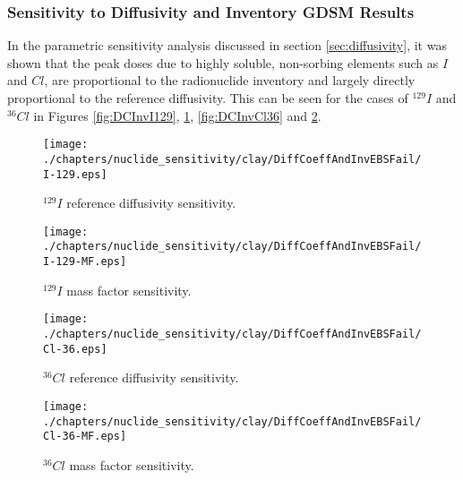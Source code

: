 
\subsubsection{Sensitivity to Diffusivity and Inventory GDSM Results}

In the parametric sensitivity analysis discussed in section
\ref{sec:diffusivity}, it was shown that
the peak doses due to highly soluble, non-sorbing elements such as $I$ and $Cl$, 
are  proportional to the radionuclide inventory and 
largely directly proportional to the reference diffusivity. This can be seen for 
the cases of $^{129}I$ and $^{36}Cl$ in Figures \ref{fig:DCInvI129}, 
\ref{fig:DCInvI129MF}, \ref{fig:DCInvCl36} and \ref{fig:DCInvCl36MF}.

\begin{figure}[ht]
\centering
\begin{minipage}[b]{0.45\linewidth}

\texttt{[image: ./chapters/nuclide\_sensitivity/clay/DiffCoeffAndInvEBSFail/I-129.eps]}
\caption{$^{129}I$ reference diffusivity sensitivity.}
\label{fig:DCInvI129}

\end{minipage}
\hspace{0.05\linewidth}
\begin{minipage}[b]{0.45\linewidth}

\texttt{[image: ./chapters/nuclide\_sensitivity/clay/DiffCoeffAndInvEBSFail/I-129-MF.eps]}
\caption{$^{129}I$ mass factor sensitivity.}
\label{fig:DCInvI129MF}

\end{minipage}
\end{figure}

\begin{figure}[ht]
\begin{minipage}[b]{0.45\linewidth}

\texttt{[image: ./chapters/nuclide\_sensitivity/clay/DiffCoeffAndInvEBSFail/Cl-36.eps]}
\caption{$^{36}Cl$ reference diffusivity sensitivity.}
\label{fig:DCInvCl36}

\end{minipage}
\hspace{0.05\linewidth}
\begin{minipage}[b]{0.45\linewidth}

\texttt{[image: ./chapters/nuclide\_sensitivity/clay/DiffCoeffAndInvEBSFail/Cl-36-MF.eps]}
\caption{$^{36}Cl$ mass factor sensitivity.}
\label{fig:DCInvCl36MF}

\end{minipage}
\end{figure}

